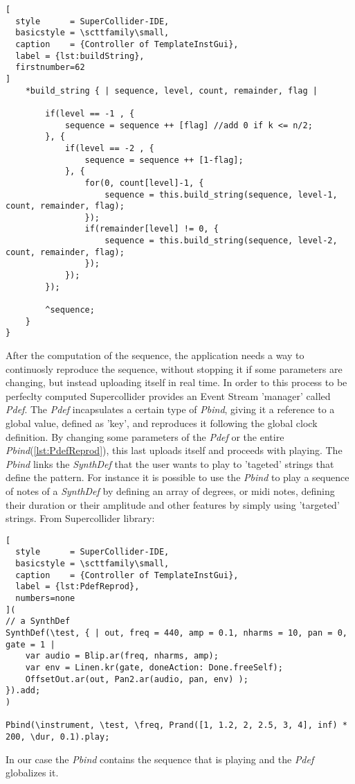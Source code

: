 \documentclass[main.tex]{subfiles}
\begin{document}
\begin{lstlisting}[
  style      = SuperCollider-IDE,
  basicstyle = \scttfamily\small,
  caption    = {Controller of TemplateInstGui},
  label = {lst:buildString},
  firstnumber=62
]
	*build_string { | sequence, level, count, remainder, flag |

		if(level == -1 , {
			sequence = sequence ++ [flag] //add 0 if k <= n/2;
		}, {
			if(level == -2 , {
				sequence = sequence ++ [1-flag];
			}, {
				for(0, count[level]-1, {
					sequence = this.build_string(sequence, level-1, count, remainder, flag);
				});
				if(remainder[level] != 0, {
					sequence = this.build_string(sequence, level-2, count, remainder, flag);
				});
			});
		});

		^sequence;
	}
}
\end{lstlisting}

After the computation of the sequence, the application needs a way to continuosly reproduce the sequence, without stopping it if some parameters are changing, but instead uploading itself in real time. In order to this process to be perfeclty computed Supercollider provides an Event Stream 'manager' called \textit{Pdef}. The \textit{Pdef} incapsulates a certain type of \textit{Pbind}, giving it a reference to a global value, defined as 'key', and reproduces it following the global clock definition. By changing some parameters of the \textit{Pdef} or the entire \textit{Pbind}(\autoref{lst:PdefReprod}), this last uploads itself and proceeds with playing. The \textit{Pbind} links the \textit{SynthDef} that the user wants to play to 'tageted' strings that define the pattern. For instance it is possible to use the \textit{Pbind} to play a sequence of notes of a \textit{SynthDef} by defining an array of degrees, or midi notes, defining their duration or their amplitude and other features by simply using 'targeted' strings. From Supercollider library: 
\begin{lstlisting}[
  style      = SuperCollider-IDE,
  basicstyle = \scttfamily\small,
  caption    = {Controller of TemplateInstGui},
  label = {lst:PdefReprod},
  numbers=none
](
// a SynthDef
SynthDef(\test, { | out, freq = 440, amp = 0.1, nharms = 10, pan = 0, gate = 1 |
    var audio = Blip.ar(freq, nharms, amp);
    var env = Linen.kr(gate, doneAction: Done.freeSelf);
    OffsetOut.ar(out, Pan2.ar(audio, pan, env) );
}).add;
)

Pbind(\instrument, \test, \freq, Prand([1, 1.2, 2, 2.5, 3, 4], inf) * 200, \dur, 0.1).play;
\end{lstlisting}
In our case the \textit{Pbind} contains the sequence that is playing and the \textit{Pdef} globalizes it. 
\end{document}
